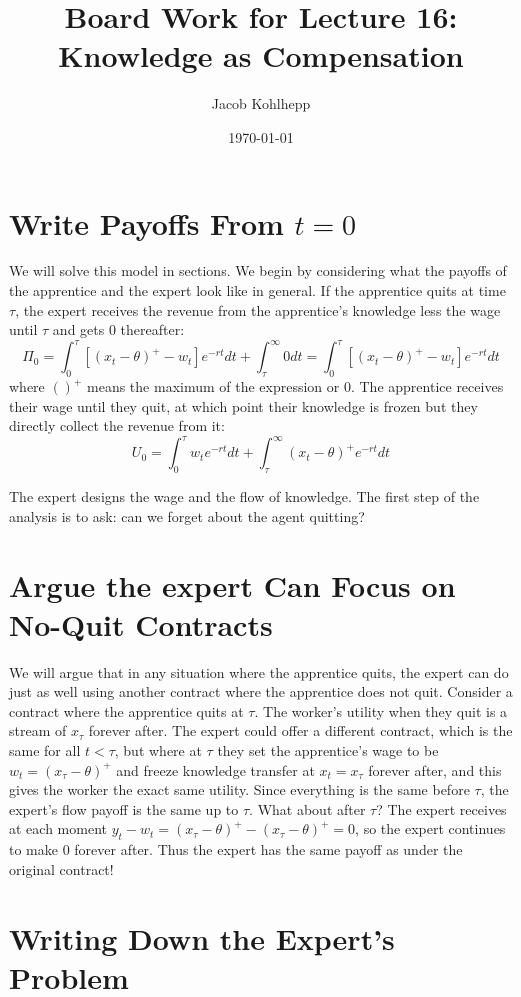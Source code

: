 \documentclass{article}
\title{Board Work for Lecture 16: Knowledge as Compensation}
\author{Jacob Kohlhepp}
\date{\today}
\begin{document}
\maketitle


\section{Write Payoffs From $t=0$}
We will solve this model in sections. We begin by considering what the payoffs of the apprentice and the expert look like in general. If the apprentice quits at time $\tau$, the expert receives the revenue from the apprentice's knowledge less the wage until $\tau$ and gets 0 thereafter:
\[\Pi_0 = \int^\tau_0 [(x_t-\theta)^+ - w_t]e^{-rt} dt +\int^\infty_\tau 0 dt =\int^\tau_0 [(x_t-\theta)^+ - w_t]e^{-rt} dt\]
where $()^+$ means the maximum of the expression or 0. The apprentice receives their wage until they quit, at which point their knowledge is frozen but they directly collect the revenue from it:
\[U_0 = \int_0^\tau w_te^{-rt}dt  + \int_\tau^\infty (x_t-\theta)^+ e^{-rt}dt \]

The expert designs the wage and the flow of knowledge. The first step of the analysis is to ask: can we forget about the agent quitting?
\section{Argue the expert Can Focus on No-Quit Contracts}

We will argue that in any situation where the apprentice quits, the expert can do just as well using another contract where the apprentice does not quit. Consider a contract where the apprentice quits at $\tau$. The worker's utility when they quit is a stream of $x_\tau$ forever after. The expert could offer a different contract, which is the same for all $t<\tau$, but where at $\tau$ they set the apprentice's wage to be $w_t=(x_\tau-\theta)^+$ and freeze knowledge transfer at $x_t=x_\tau$ forever after, and this gives the worker the exact same utility. Since everything is the same before $\tau$, the expert's flow payoff is the same up to $\tau$. What about after $\tau$? The expert receives at each moment $y_t-w_t=(x_\tau-\theta)^+-(x_\tau-\theta)^+=0$, so the expert continues to make 0 forever after. Thus the expert has the same payoff as under the original contract!

\section{Writing Down the Expert's Problem}
\end{document}
